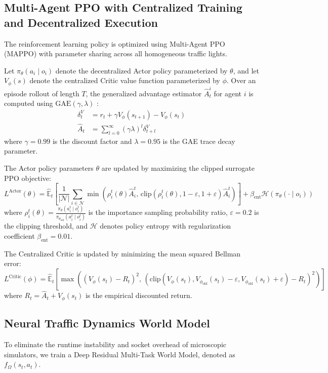 \documentclass[12pt,a4paper,oneside]{report}
\begin{document}
\subsection{Multi-Agent PPO with Centralized Training and Decentralized Execution}
The reinforcement learning policy is optimized using Multi-Agent PPO (MAPPO) with parameter sharing across all homogeneous traffic lights.

Let $\pi_\theta(a_i \mid o_i)$ denote the decentralized Actor policy parameterized by $\theta$, and let $V_\phi(s)$ denote the centralized Critic value function parameterized by $\phi$. Over an episode rollout of length $T$, the generalized advantage estimator $\hat{A}_t^i$ for agent $i$ is computed using $\text{GAE}(\gamma, \lambda)$ \cite{ref_schulman2015gae}:
\begin{align}
\delta_t^V &= r_t + \gamma V_\phi(s_{t+1}) - V_\phi(s_t) \\
\hat{A}_t &= \sum_{l=0}^\infty (\gamma \lambda)^l \delta_{t+l}^V
\end{align}
where $\gamma = 0.99$ is the discount factor and $\lambda = 0.95$ is the GAE trace decay parameter.

The Actor policy parameters $\theta$ are updated by maximizing the clipped surrogate PPO objective:
\begin{equation}
L^{\text{Actor}}(\theta) = \hat{\mathbb{E}}_t \left[ \frac{1}{|\mathcal{N}|} \sum_{i \in \mathcal{N}} \min\left(\rho_i^t(\theta)\hat{A}_i^t, \, \text{clip}(\rho_i^t(\theta), 1-\varepsilon, 1+\varepsilon)\hat{A}_i^t\right) \right] + \beta_{\text{ent}} \mathcal{H}\left(\pi_\theta(\cdot \mid o_i)\right)
\end{equation}
where $\rho_i^t(\theta) = \frac{\pi_\theta(a_i^t \mid o_i^t)}{\pi_{\theta_{\text{old}}}(a_i^t \mid o_i^t)}$ is the importance sampling probability ratio, $\varepsilon = 0.2$ is the clipping threshold, and $\mathcal{H}$ denotes policy entropy with regularization coefficient $\beta_{\text{ent}} = 0.01$.

The Centralized Critic is updated by minimizing the mean squared Bellman error:
\begin{equation}
L^{\text{Critic}}(\phi) = \hat{\mathbb{E}}_t \left[ \max\left( (V_\phi(s_t) - R_t)^2, \, (\text{clip}(V_\phi(s_t), V_{\phi_{\text{old}}}(s_t) - \varepsilon, V_{\phi_{\text{old}}}(s_t) + \varepsilon) - R_t)^2 \right) \right]
\end{equation}
where $R_t = \hat{A}_t + V_\phi(s_t)$ is the empirical discounted return.

\subsection{Neural Traffic Dynamics World Model}
To eliminate the runtime instability and socket overhead of microscopic simulators, we train a Deep Residual Multi-Task World Model, denoted as $f_\Omega(s_t, a_t)$.
\end{document}
